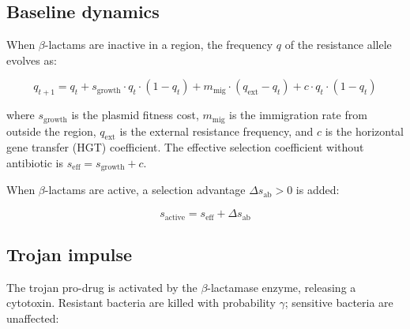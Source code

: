 \documentclass[12pt,a4paper]{article}
\begin{document}
\begin{table}[h]
\centering
\caption{Rotation schedule by region.}
\label{tab:rotation}
\end{table}

\subsection{Baseline dynamics}

When $\beta$-lactams are inactive in a region, the frequency $q$ of the resistance allele evolves as:

\begin{equation}
q_{t+1} = q_t + s_{\text{growth}} \cdot q_t \cdot (1 - q_t) + m_{\text{mig}} \cdot (q_{\text{ext}} - q_t) + c \cdot q_t \cdot (1 - q_t)
\label{eq:q_baseline}
\end{equation}

where $s_{\text{growth}}$ is the plasmid fitness cost, $m_{\text{mig}}$ is the immigration rate from outside the region, $q_{\text{ext}}$ is the external resistance frequency, and $c$ is the horizontal gene transfer (HGT) coefficient. The effective selection coefficient without antibiotic is $s_{\text{eff}} = s_{\text{growth}} + c$.

When $\beta$-lactams are active, a selection advantage $\Delta s_{\text{ab}} > 0$ is added:

\begin{equation}
s_{\text{active}} = s_{\text{eff}} + \Delta s_{\text{ab}}
\label{eq:s_active}
\end{equation}

\subsection{Trojan impulse}

The trojan pro-drug is activated by the $\beta$-lactamase enzyme, releasing a cytotoxin. Resistant bacteria are killed with probability $\gamma$; sensitive bacteria are unaffected:
\end{document}
